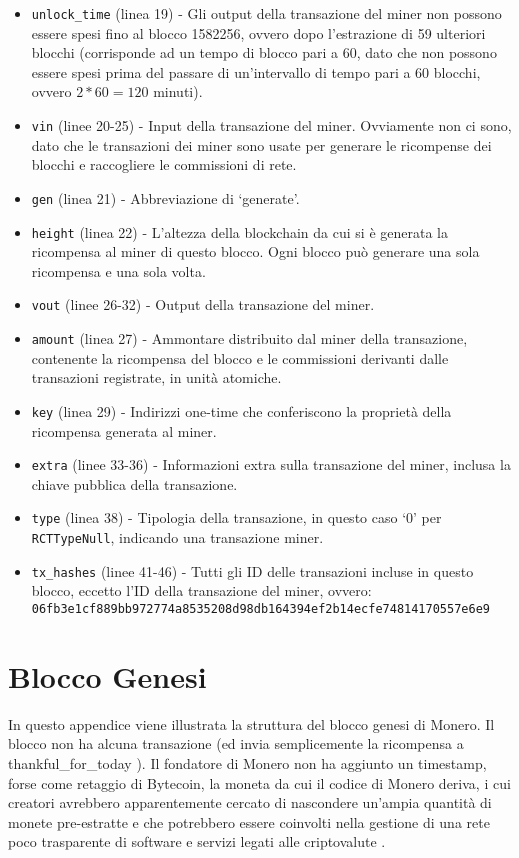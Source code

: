 \begin{appendices}
\begin{itemize}
    \item {\tt unlock\_time} (linea 19) - Gli output della transazione del miner non possono essere spesi fino al blocco 1582256\nth, ovvero dopo l'estrazione di 59 ulteriori blocchi (corrisponde ad un tempo di blocco pari a 60, dato che non possono essere spesi prima del passare di un'intervallo di tempo pari a 60 blocchi, ovvero $2*60 = 120$ minuti).
    \item {\tt vin} (linee 20-25) - Input della transazione del miner. Ovviamente non ci sono, dato che le transazioni dei miner sono usate per generare le ricompense dei blocchi e raccogliere le commissioni di rete.
    \item {\tt gen} (linea 21) - Abbreviazione di `generate'.
    \item {\tt height} (linea 22) - L'altezza della blockchain da cui si è generata la ricompensa al miner di questo blocco. Ogni blocco può generare una sola ricompensa e una sola volta.
    \item {\tt vout} (linee 26-32) - Output della transazione del miner.
    \item {\tt amount} (linea 27) - Ammontare distribuito dal miner della transazione, contenente la ricompensa del blocco e le commissioni derivanti dalle transazioni registrate, in unità atomiche.
    \item {\tt key} (linea 29) - Indirizzi one-time che conferiscono la proprietà della ricompensa generata al miner.
    \item {\tt extra} (linee 33-36) - Informazioni extra sulla transazione del miner, inclusa la chiave pubblica della transazione.
    \item {\tt type} (linea 38) - Tipologia della transazione, in questo caso `0' per {\tt RCTTypeNull}, indicando una transazione miner.
    \item {\tt tx\_hashes} (linee 41-46) - Tutti gli ID delle transazioni incluse in questo blocco, eccetto l'ID della transazione del miner, ovvero:\\ {\tt 06fb3e1cf889bb972774a8535208d98db164394ef2b14ecfe74814170557e6e9}
\end{itemize}




\chapter{Blocco Genesi}
\label{appendix:genesis-block}

In questo appendice viene illustrata la struttura del blocco genesi di Monero. Il blocco non ha alcuna transazione (ed invia semplicemente la ricompensa a thankful\_for\_today \cite{bitmonero-launched}). Il fondatore di Monero non ha aggiunto un timestamp, forse come retaggio di Bytecoin, la moneta da cui il codice di Monero deriva, i cui creatori avrebbero apparentemente cercato di nascondere un'ampia quantità di monete pre-estratte \cite{monero-history} e che potrebbero essere coinvolti nella gestione di una rete poco trasparente di software e servizi legati alle criptovalute \cite{bytecoin-network}.


\end{appendices}
